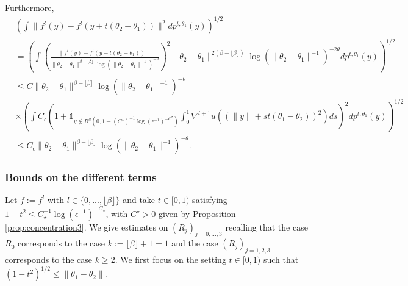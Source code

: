 \documentclass{article}
\begin{document}
Furthermore,
\begin{align}\label{align:unautreboundparmit}
    &\left(\int \|f^l(y)-f^l(y+t(\theta_2-\theta_1))\|^2dp^{t,\theta_1}(y)\right)^{1/2}\nonumber\\
    & = \left(\int \left(\frac{\|f^l(y)-f^l(y+t(\theta_2-\theta_1))\|}{\|\theta_2-\theta_1\|^{\beta-\lfloor \beta \rfloor}\log(\|\theta_2-\theta_1\|^{-1})^{-\theta}}\right)^2\|\theta_2-\theta_1\|^{2(\beta-\lfloor \beta \rfloor)}\log(\|\theta_2-\theta_1\|^{-1})^{-2\theta}dp^{t,\theta_1}(y)\right)^{1/2}\nonumber\\
    & \leq C \|\theta_2-\theta_1\|^{\beta-\lfloor \beta \rfloor}\log(\|\theta_2-\theta_1\|^{-1})^{-\theta}\nonumber\\
    & \times \left(\int C_\epsilon\left(1+\mathds{1}_{y\notin B^d(0,1-(C^\star)^{-1}\log(\epsilon^{-1})^{-C^\star})}\int_0^1 \nabla^{l+1}u((\|y\|+st(\theta_1-\theta_2))^2) ds\right)^2dp^{t,\theta_1}(y)\right)^{1/2}\nonumber\\
    & \leq C_\epsilon\|\theta_2-\theta_1\|^{\beta-\lfloor \beta \rfloor}\log(\|\theta_2-\theta_1\|^{-1})^{-\theta}.
\end{align}






\subsubsection{Bounds on the different terms}\label{sec:bounondiff3}
Let $f:=f^{l}$ with $l\in \{0,...,\lfloor \beta \rfloor\}$ and take $t\in [0,1)$ satisfying $1-t^2\leq C_\star^{-1}\log(\epsilon^{-1})^{-C_\star}$, with $C^\star>0$ given by Proposition \ref{prop:concentration3}. We give estimates on $(R_j)_{j=0,...,3}$ recalling that the case $R_0$ corresponds to the case $k:=\lfloor \beta \rfloor +1= 1$ and the case  $(R_j)_{j=1,2,3}$ corresponds to the case $k\geq 2$. We first focus on the setting $t\in [0,1)$ such that $(1-t^2)^{1/2}\leq \|\theta_1-\theta_2\|$. 
\end{document}
